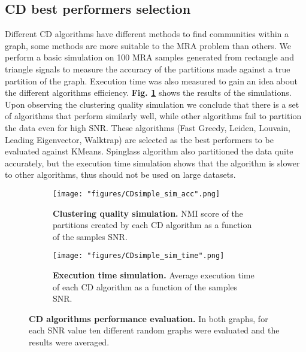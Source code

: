 \subsection{\acrlong{CD} best performers selection}
Different \acrshort{CD} algorithms have different methods to find communities within a graph, some methods are more suitable to the \acrshort{MRA} problem than others. We perform a basic simulation on 100 \acrshort{MRA} samples generated from rectangle and triangle signals to measure the accuracy of the partitions made against a true partition of the graph. Execution time was also measured to gain an idea about the different algorithms efficiency. \textbf{Fig. \ref{fig:basic_sim}} shows the results of the simulations. Upon observing the clustering quality simulation we conclude that there is a set of algorithms that perform similarly well, while other algorithms fail to partition the data even for high \acrshort{SNR}. These algorithms (Fast Greedy, Leiden, Louvain, Leading Eigenvector, Walktrap) are selected as the best performers to be evaluated against KMeans. Spinglass algorithm also partitioned the data quite accurately, but the execution time simulation shows that the algorithm is slower to other algorithms, thus should not be used on large datasets.

\begin{figure}[h]
\begin{subfigure}[h]{0.49\linewidth}
\texttt{[image: "figures/CDsimple\_sim\_acc".png]}
\caption{\textbf{Clustering quality simulation.} \acrshort{NMI} score of the partitions created by each \acrshort{CD} algorithm as a function of the samples \acrshort{SNR}.}
\end{subfigure}
\hfill
\begin{subfigure}[h]{0.49\linewidth}
\texttt{[image: "figures/CDsimple\_sim\_time".png]}
\caption{\textbf{Execution time simulation.} Average execution time of each \acrshort{CD} algorithm as a function of the samples \acrshort{SNR}.}
\end{subfigure}
\caption{\textbf{\acrlong{CD} algorithms performance evaluation.} In both graphs, for each \acrshort{SNR} value ten different random graphs were evaluated and the results were averaged.}
\label{fig:basic_sim}
\end{figure}

